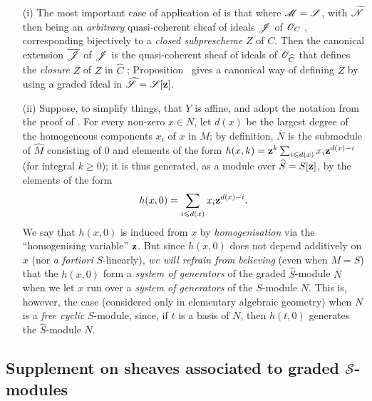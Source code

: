 \begin{remark}[8.13.4]
\label{II.8.13.4}
\begin{enumerate}
    \item[\rm{(i)}] The most important case of application of  is that where $\mathscr{M}=\mathscr{S}$, with $\widetilde{\mathscr{N}}$ then being an \emph{arbitrary} quasi-coherent sheaf of ideals $\mathscr{J}$ of $\mathscr{O}_C$ , corresponding bijectively to a \emph{closed subprescheme} $Z$ of $C$.
        Then the canonical extension $\overline{\mathscr{J}}$ of $\mathscr{J}$ is the quasi-coherent sheaf of ideals of $\mathscr{O}_{\widehat{C}}$ that defines the \emph{closure} $\overline{Z}$ of $Z$ in $\widehat{C}$ ;
        Proposition~ gives a canonical way of defining $\overline{Z}$ by using a graded ideal in $\widehat{\mathscr{S}}=\mathscr{S}[\mathbf{z}]$.
    \item[\rm{(ii)}] Suppose, to simplify things, that $Y$ is affine, and adopt the notation from the proof of .
        For every non-zero $x\in N$, let $d(x)$ be the largest degree of the homogeneous components $x_i$ of $x$ in $M$;
        by definition, $\overline{N}$ is the submodule of $\widehat{M}$ consisting of $0$ and elements of the form $h(x,k)=\mathbf{z}^k\sum_{i\leqslant d(x)}x_i\mathbf{z}^{d(x)-i}$ (for integral $k\geq0$);
        it is thus generated, as a module over $\widehat{S}=S[\mathbf{z}]$, by the elements of the form
        \[
            h(x,0) = \sum_{i\leqslant d(x)}x_i\mathbf{z}^{d(x)-i}.
        \]
        We say that $h(x,0)$ is induced from $x$ by \emph{homogenisation} via the ``homogenising variable'' $\mathbf{z}$.
        But since $h(x,0)$ does not depend additively on $x$ (nor \emph{a fortiori} $S$-linearly), \emph{we will refrain from believing} (even when $M=S$) that the $h(x,0)$ form a \emph{system of generators} of the graded $\widehat{S}$-module $\overline{N}$ when we let $x$ run over a \emph{system of generators} of the $S$-module $N$.
        This is, however, the case (considered only in elementary algebraic geometry) when $N$ is a \emph{free cyclic} $S$-module, since, if $t$ is a basis of $N$, then $h(t,0)$ generates the $\widehat{S}$-module $\overline{N}$.
\end{enumerate}
\end{remark}


\subsection{Supplement on sheaves associated to graded $\mathcal{S}$-modules}
\label{subsection:II.8.14}


